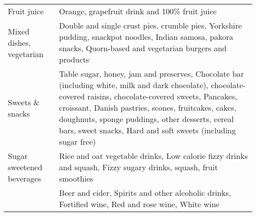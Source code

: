 \begin{longtable}{@{\extracolsep{\fill}}>{\raggedright\arraybackslash}p{}>{\raggedright\arraybackslash}p{}}
Fruit juice & Orange, grapefruit drink and 100\% fruit juice \\ 
Mixed dishes, vegetarian & Double and single crust pies, crumble pies, Yorkshire pudding, snackpot noodles,
  Indian samosa, pakora snacks, Quorn-based and vegetarian burgers and products \\ 
Sweets \& snacks & Table sugar, honey, jam and preserves,
  Chocolate bar (including white, milk and dark chocolate), chocolate-covered raisins, chocolate-covered sweets,
  Pancakes, croissant, Danish pastries, scones, fruitcakes, cakes, doughnuts, sponge puddings, other desserts, cereal bars, sweet snacks,
  Hard and soft sweets (including sugar free) \\ 
Sugar sweetened beverages & Rice and oat vegetable drinks, Low calorie fizzy drinks and squash, Fizzy sugary drinks, squash, fruit smoothies \\ 
{\bfseries Alcoholic beverages} & Beer and cider, Spirits and other alcoholic drinks, Fortified wine, Red and rose wine, White wine \\ 
\bottomrule
\end{longtable}
\endgroup

